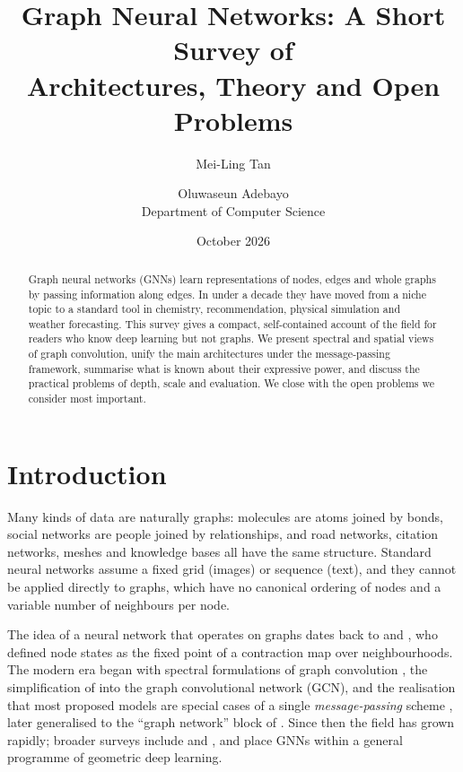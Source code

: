 \documentclass[11pt]{article}
\title{Graph Neural Networks: A Short Survey of\\Architectures, Theory and Open Problems}
\author{Mei-Ling Tan \and Oluwaseun Adebayo\\[4pt]
  \small Department of Computer Science}
\date{October 2026}
\theoremstyle{plain}
\theoremstyle{definition}
\begin{document}
\maketitle

\begin{abstract}
Graph neural networks (GNNs) learn representations of nodes, edges and whole graphs by passing information along edges. In under a decade they have moved from a niche topic to a standard tool in chemistry, recommendation, physical simulation and weather forecasting. This survey gives a compact, self-contained account of the field for readers who know deep learning but not graphs. We present spectral and spatial views of graph convolution, unify the main architectures under the message-passing framework, summarise what is known about their expressive power, and discuss the practical problems of depth, scale and evaluation. We close with the open problems we consider most important.
\end{abstract}

\section{Introduction}
\label{sec:intro}

Many kinds of data are naturally graphs: molecules are atoms joined by bonds, social networks are people joined by relationships, and road networks, citation networks, meshes and knowledge bases all have the same structure. Standard neural networks assume a fixed grid (images) or sequence (text), and they cannot be applied directly to graphs, which have no canonical ordering of nodes and a variable number of neighbours per node.

The idea of a neural network that operates on graphs dates back to \citet{gori2005} and \citet{scarselli2009}, who defined node states as the fixed point of a contraction map over neighbourhoods. The modern era began with spectral formulations of graph convolution \citep{bruna2014,defferrard2016}, the simplification of \citet{kipf2017} into the graph convolutional network (GCN), and the realisation that most proposed models are special cases of a single \emph{message-passing} scheme \citep{gilmer2017}, later generalised to the ``graph network'' block of \citet{battaglia2018}. Since then the field has grown rapidly; broader surveys include \citet{wu2021survey} and \citet{zhou2020}, and \citet{bronstein2017,bronstein2021} place GNNs within a general programme of geometric deep learning.
\end{document}
